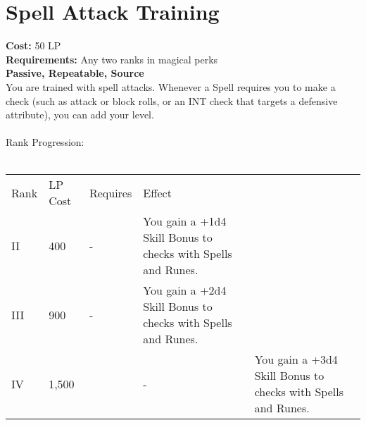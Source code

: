 \section{Spell Attack Training}\label{perk:spellAttackTraining}
\textbf{Cost:} 50 LP\\
\textbf{Requirements:} Any two ranks in magical perks\\
\textbf{Passive, Repeatable, Source}\\
You are trained with spell attacks.
Whenever a Spell requires you to make a check (such as attack or block rolls, or an INT check that targets a defensive attribute), you can add your level.\\
\\
Rank Progression:\\
\\
\begin{longtable}{l | l | l | l | p{9cm}}
	Rank & LP Cost & Requires & Effect\\
	II & 400 & - & You gain a +1d4 Skill Bonus to checks with Spells and Runes.\\
	III & 900 & - & You gain a +2d4 Skill Bonus to checks with Spells and Runes.\\
	IV & 1,500 && - & You gain a +3d4 Skill Bonus to checks with Spells and Runes.\\
\end{longtable}